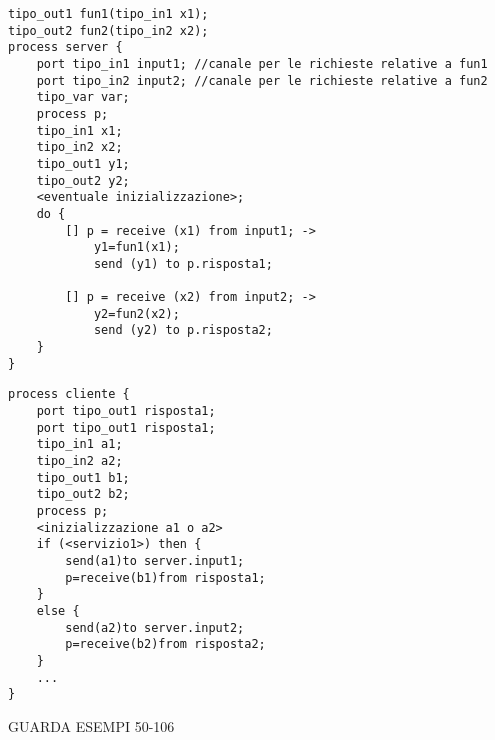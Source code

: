 \begin{verbatim}
tipo_out1 fun1(tipo_in1 x1);
tipo_out2 fun2(tipo_in2 x2);
process server {
    port tipo_in1 input1; //canale per le richieste relative a fun1
    port tipo_in2 input2; //canale per le richieste relative a fun2
    tipo_var var;
    process p;
    tipo_in1 x1;
    tipo_in2 x2;
    tipo_out1 y1;
    tipo_out2 y2;
    <eventuale inizializzazione>;
    do {
        [] p = receive (x1) from input1; ->
            y1=fun1(x1);
            send (y1) to p.risposta1;

        [] p = receive (x2) from input2; ->
            y2=fun2(x2);
            send (y2) to p.risposta2;
    }
}
\end{verbatim}

\begin{verbatim}
process cliente {
    port tipo_out1 risposta1;
    port tipo_out1 risposta1;
    tipo_in1 a1;
    tipo_in2 a2;
    tipo_out1 b1;
    tipo_out2 b2;
    process p;
    <inizializzazione a1 o a2>
    if (<servizio1>) then {
        send(a1)to server.input1;
        p=receive(b1)from risposta1;
    }
    else {
        send(a2)to server.input2;
        p=receive(b2)from risposta2;
    }
    ...
}
\end{verbatim}


GUARDA ESEMPI 50-106
























